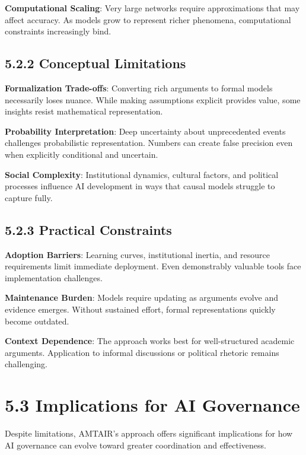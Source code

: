 \documentclass[
  11pt,
  letterpaper,
  openany]{book}
\begin{document}
\textbf{Computational Scaling}: Very large networks require
approximations that may affect accuracy. As models grow to represent
richer phenomena, computational constraints increasingly bind.

\subsection{5.2.2 Conceptual
Limitations}\label{sec-conceptual-limitations}

\textbf{Formalization Trade-offs}: Converting rich arguments to formal
models necessarily loses nuance. While making assumptions explicit
provides value, some insights resist mathematical representation.

\textbf{Probability Interpretation}: Deep uncertainty about
unprecedented events challenges probabilistic representation. Numbers
can create false precision even when explicitly conditional and
uncertain.

\textbf{Social Complexity}: Institutional dynamics, cultural factors,
and political processes influence AI development in ways that causal
models struggle to capture fully.

\subsection{5.2.3 Practical
Constraints}\label{sec-practical-constraints}

\textbf{Adoption Barriers}: Learning curves, institutional inertia, and
resource requirements limit immediate deployment. Even demonstrably
valuable tools face implementation challenges.

\textbf{Maintenance Burden}: Models require updating as arguments evolve
and evidence emerges. Without sustained effort, formal representations
quickly become outdated.

\textbf{Context Dependence}: The approach works best for well-structured
academic arguments. Application to informal discussions or political
rhetoric remains challenging.

\section{5.3 Implications for AI
Governance}\label{sec-governance-implications}

Despite limitations, AMTAIR's approach offers significant implications
for how AI governance can evolve toward greater coordination and
effectiveness.
\end{document}
